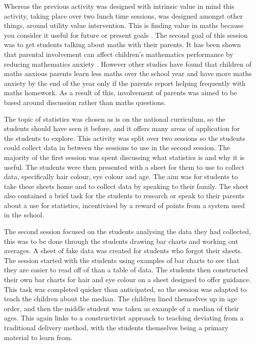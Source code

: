\documentclass[11pt, a4paper, notitlepage]{article}
\begin{document}
Whereas the previous activity was designed with intrinsic value in mind this activity, taking place over two lunch time sessions, was designed amongst other things, around utility value intervention. This is finding value in maths because you consider it useful for future or present goals \cite{MAES:2024}. The second goal of this session was to get students talking about maths with their parents. It has been shown that parental involvement can affect children's mathematics performance by reducing mathematics anxiety \cite{Vukovic01052013}. However other studies have found that children of maths anxious parents learn less maths over the school year and have more maths anxiety by the end of the year only if the parents report helping frequently with maths homework\cite{Maloney:2015}. As a result of this, involvement of parents was aimed to be based around discussion rather than maths questions.
\par
The topic of statistics was chosen as is on the national curriculum, so the students should have seen it before, and it offers many areas of application for the students to explore. This activity was split over two sessions so the students could collect data in between the sessions to use in the second session. The majority of the first session was spent discussing what statistics is and why it is useful. The students were then presented with a sheet for them to use to collect data, specifically hair colour, eye colour and age. 
The aim was for students to take these sheets home and to collect data by speaking to their family. The sheet also contained a brief task for the students to research or speak to their parents about a use for statistics, incentivised by a reward of points from a system used in the school.
\par
\vspace{1em}
The second session focused on the students analysing the data they had collected, this was to be done through the students drawing bar charts and working out averages. A sheet of fake data was created for students who forgot their sheets. The session started with the students using examples of bar charts to see that they are easier to read off of than a table of data. The students then constructed their own bar charts for hair and eye colour on a sheet designed to offer guidance. This task was completed quicker than anticipated, so the session was adapted to teach the children about the median. The children lined themselves up in age order, and then the middle student was taken as example of a median of their ages. This again links to a constructivist approach to teaching deviating from a traditional delivery method, with the students themselves being a primary material to learn from.
\end{document}
